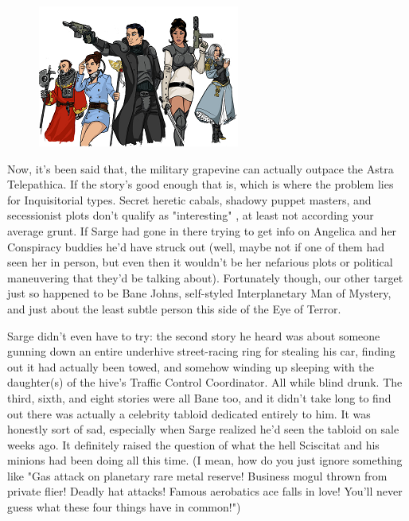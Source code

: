 \begin{figure}
	\begin{center}
		\includegraphics[width=\figwidth]{pics/19/24.png}
	\end{center}
\end{figure}
Now, it's been said that, the military grapevine can actually outpace the Astra Telepathica. 
If the story's good enough that is, which is where the problem lies for Inquisitorial types. 
Secret heretic cabals, shadowy puppet masters, and secessionist plots don't qualify as "interesting" , at least not according your average grunt. 
If Sarge had gone in there trying to get info on Angelica and her Conspiracy buddies he'd have struck out (well, maybe not if one of them had seen her in person, but even then it wouldn't be her nefarious plots or political maneuvering that they'd be talking about). 
Fortunately though, our other target just so happened to be Bane Johns, self-styled Interplanetary Man of Mystery, and just about the least subtle person this side of the Eye of Terror. 


Sarge didn't even have to try: 
the second story he heard was about someone gunning down an entire underhive street-racing ring for stealing his car, finding out it had actually been towed, and somehow winding up sleeping with the daughter(s) of the hive's Traffic Control Coordinator. 
All while blind drunk. 
The third, sixth, and eight stories were all Bane too, and it didn't take long to find out there was actually a celebrity tabloid dedicated entirely to him. 
It was honestly sort of sad, especially when Sarge realized he'd seen the tabloid on sale weeks ago. 
It definitely raised the question of what the hell Sciscitat and his minions had been doing all this time. 
(I mean, how do you just ignore something like "Gas attack on planetary rare metal reserve! 
Business mogul thrown from private flier! 
Deadly hat attacks! 
Famous aerobatics ace falls in love! 
You'll never guess what these four things have in common!")

